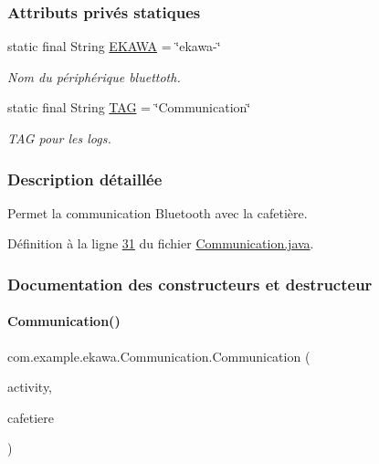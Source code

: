 \subsubsection*{Attributs privés statiques}
\begin{DoxyCompactItemize}
\item 
static final String \hyperlink{classcom_1_1example_1_1ekawa_1_1_communication_a85da929bac3fd83864a79ed4c3a57044}{E\+K\+A\+WA} = \char`\"{}ekawa-\/\char`\"{}
\begin{DoxyCompactList}\small\item\em Nom du périphérique bluettoth. \end{DoxyCompactList}\item 
static final String \hyperlink{classcom_1_1example_1_1ekawa_1_1_communication_af355bac38153a4e6d1cda0b3e74bc1c7}{T\+AG} = \char`\"{}Communication\char`\"{}
\begin{DoxyCompactList}\small\item\em T\+AG pour les logs. \end{DoxyCompactList}\end{DoxyCompactItemize}


\subsubsection{Description détaillée}
Permet la communication Bluetooth avec la cafetière. 

Définition à la ligne \hyperlink{_communication_8java_source_l00031}{31} du fichier \hyperlink{_communication_8java_source}{Communication.\+java}.



\subsubsection{Documentation des constructeurs et destructeur}
\mbox{\label{classcom_1_1example_1_1ekawa_1_1_communication_a78557db29f39808417c9fa4435b90d3b}} 
\paragraph{\texorpdfstring{Communication()}{Communication()}}
{\footnotesize\ttfamily com.\+example.\+ekawa.\+Communication.\+Communication (\begin{DoxyParamCaption}\item[{App\+Compat\+Activity}]{activity,  }\item[{\hyperlink{classcom_1_1example_1_1ekawa_1_1_cafetiere}{Cafetiere}}]{cafetiere }\end{DoxyParamCaption})}



